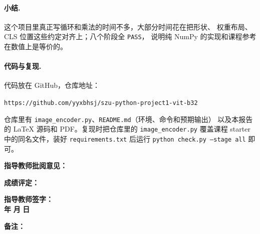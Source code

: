 \documentclass[a4paper,12pt]{article}
\begin{document}
\paragraph{小结.} 这个项目里真正写循环和乘法的时间不多，大部分时间花在把形状、
权重布局、CLS 位置这些约定对齐上；八个阶段全 \texttt{PASS}，
说明纯 NumPy 的实现和课程参考在数值上是等价的。

\paragraph{代码与复现.} 代码放在 GitHub，仓库地址：

\noindent\texttt{https://github.com/yyxbhsj/szu-python-project1-vit-b32}

\noindent 仓库里有 \texttt{image\_encoder.py}、\texttt{README.md}（环境、命令和预期输出）
以及本报告的 \LaTeX{} 源码和 PDF。复现时把仓库里的 \texttt{image\_encoder.py} 覆盖课程 starter
中的同名文件，装好 \texttt{requirements.txt} 后运行 \texttt{python check.py --stage all} 即可。

\newpage



\vspace{1cm}

\noindent \textbf{指导教师批阅意见：}
\vspace{6cm}
\hfill

\vspace{1cm}

\noindent \textbf{成绩评定：}
\vspace{2cm}
\hfill

\vspace{1cm}

\noindent
\hfill
\textbf{指导教师签字：}\quad\quad\quad\quad\quad\\[0.5cm]

\hfill
\textbf{年}\quad\quad
\textbf{月}\quad\quad
\textbf{日}\quad

\vspace{1cm}

\noindent \textbf{备注：}
\end{document}
